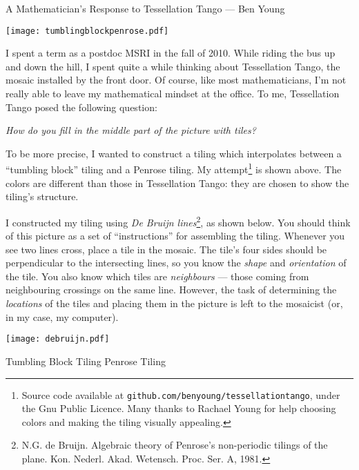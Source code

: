 \documentclass[11pt]{article}
\begin{document}
\begin{center}
\Large
A Mathematician's Response to Tessellation Tango --- Ben Young
\end{center}

\texttt{[image: tumblingblockpenrose.pdf]}

I spent a term as a postdoc MSRI in the fall of 2010.  While riding the bus up and down the hill, I spent quite a while thinking about Tessellation Tango, the mosaic installed by the front door.  Of course, like most mathematicians, I'm not really able to leave my mathematical mindset at the office.  To me, Tessellation Tango posed the following question: 
\begin{center}
\emph{How do you fill in the middle part of the picture with tiles?}
\end{center}
To be more precise, I wanted to construct a tiling which interpolates between a ``tumbling block''  tiling and a Penrose tiling.  My attempt\footnote{Source code available at \texttt{github.com/benyoung/tessellationtango}, under the Gnu Public Licence.  Many thanks to Rachael Young for help choosing colors and making the tiling visually appealing.} is shown above.  The colors are different than those in Tessellation Tango: they are chosen to show the tiling's structure.

I constructed my tiling using \emph{De Bruijn lines}\footnote{N.G. de Bruijn. Algebraic theory of Penrose's non-periodic tilings of the plane. Kon. Nederl. Akad. Wetensch. Proc. Ser. A, 1981.}, as shown below.  You should think of this picture as a set of ``instructions'' for assembling the tiling.  Whenever you see two lines cross, place a tile in the mosaic.  The tile's four sides should be perpendicular to the intersecting lines, so you know the \emph{shape} and \emph{orientation} of the tile.  You also know which tiles are \emph{neighbours} --- those coming from neighbouring crossings on the same line.  However, the task of determining the \emph{locations} of the tiles and placing them in the picture is left to the mosaicist (or, in my case, my computer).


\texttt{[image: debruijn.pdf]}

\small
\setlength{\parskip}{0in}
Tumbling Block Tiling
\hfill
Penrose Tiling
\end{document}
